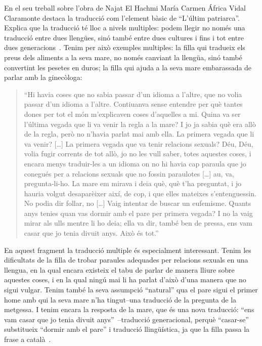 En el seu treball sobre l'obra de Najat El Hachmi María Carmen África Vidal Claramonte destaca la traducció com l'element bàsic de ``L'últim patriarca''.
Explica que la traducció té lloc a nivels multiples: podem llegir no només una traducció entre dues llengües, sinó també entre dues cultures i fins i tot entre dues generacions~\autocite{Vidal2012}.
Tenim per això exemples multiples:
la filla qui tradueix els preus dels aliments a la seva mare, no només canviant la llengüa, sinó també convertint les pesetes en duros;
la filla qui ajuda a la seva mare embarassada de parlar amb la ginecòloga:
\begin{quote}
``Hi havia coses que no sabia passar d'un idioma a l'altre, que no volia passar d'un idioma a l'altre. Contiuanva sense entendre per què tantes dones per tot el món m'explicaven coses d'aquelles a mi. Quina va ser l'última vegada que li va venir la regla a la mare? I jo ja sabia què era allò de la regla, però no n'havia parlat mai amb ella. La primera vegada que li va venir? [\ldots] La primera vegada que va tenir relacions sexuals? Déu, Déu, volia fugir corrents de tot allò, jo no les vull saber, totes aquestes coses, i encara menys traduir-les a un idioma on no hi havia cap paraula que jo conegués per a relacions sexuals que no fossin paraulotes [\ldots] au, va, pregunta-li-ho. La mare em mirava i deia què, què t'ha preguntat, i jo hauria volgut desaparèixer així, de cop, i que elles mateixes s'entenguessin. No podia dir follar, no [\ldots] Vaig intentar de buscar un eufemisme. Quants anys tenies quan vas dormir amb el pare per primera vegada? I no la vaig mirar als ulls mentre li ho deia; ella va dir, també ben de pressa, ens vam casar que jo tenia divuit anys. Això és tot.''~\autocite[217]{ElHachmi2008}
\end{quote}
En aquest fragment la traducció multiple és especialment interessant.
Tenim les dificultats de la filla de trobar paraules adequades per relacions sexuals en una llengua, en la qual encara existeix el tabu de parlar de manera lliure sobre aquestes coses,
i en la qual ningú mai li ha parlat d'això d'una manera que no sigui vulgar.
Tenim també la seva assumpció ``natural'' qua el pare sigui el primer home amb qui la seva mare n'ha tingut--una traducció de la pregunta de la metgessa.
I tenim encara la resposta de la mare, que és una nova traducció: ``ens vam casar que jo tenia divuit anys''~\autocite[217]{ElHachmi2008}--traducció generacional, perquè ``casar-se'' substitueix ``dormir amb el pare'' i traducció llingüística, ja que la filla passa la frase a català~\autocite{Vidal2012}.

